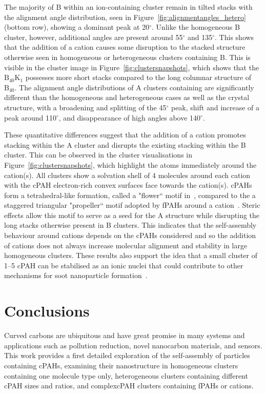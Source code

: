 The majority of B within an ion-containing cluster remain in tilted stacks with the alignment angle distribution, seen in Figure~\ref{fig:alignmentangles_hetero} (bottom row), showing a dominant peak at 20$^{\circ}$. Unlike the homogeneous B cluster, however, additional angles are present around 55$^{\circ}$ and 135$^{\circ}$. This shows that the addition of a cation causes some disruption to the stacked structure otherwise seen in homogeneous or heterogeneous clusters containing B. This is visible in the cluster image in Figure~\ref{fig:clustersnapshots}, which shows that the $\text{B}_{\text{40}}\text{K}_{\text{1}}$ possesses more short stacks compared to the long columnar structure of $\text{B}_{\text{40}}$.  The alignment angle distributions of A clusters containing  are significantly different than the homogeneous and heterogeneous cases as well as the crystal structure, with a broadening and splitting of the 45$^{\circ}$ peak, shift and increase of a peak around 110$^{\circ}$, and disappearance of high angles above 140$^{\circ}$.

These quantitative differences suggest that the addition of a cation promotes stacking within the A cluster and disrupts the existing stacking within the B cluster. This can be observed in the cluster visualisations in Figure~\ref{fig:clustersnapshots}, which highlight the atoms immediately around the cation(s). All clusters show a solvation shell of 4 molecules around each cation with the cPAH electron-rich convex surfaces face towards the cation(s). cPAHs form a tetrahedral-like formation, called a "flower`` motif in~\citet{bowal2019ion}, compared to the a staggered triangular "propeller`` motif adopted by fPAHs around a cation~\cite{bartolomei2019aggregation}. Steric effects allow this motif to serve as a seed for the A structure while disrupting the long stacks otherwise present in B clusters. This indicates that the self-assembly behaviour around cations depends on the cPAHs considered and so the addition of cations does not always increase molecular alignment and stability in large homogeneous clusters. These results also support the idea that a small cluster of 1--5 cPAH can be stabilised as an ionic nuclei that could contribute to other mechanisms for soot nanoparticle formation~\cite{Martin2018flexo}. 

\section{Conclusions}
Curved carbons are ubiquitous and have great promise in many systems and applications such as pollution reduction, novel nanocarbon materials, and sensors. This work provides a first detailed exploration of the self-assembly of particles containing cPAHs, examining their nanostructure in homogeneous clusters containing one molecule type only, heterogeneous clusters containing different cPAH sizes and ratios, and complexcPAH clusters containing fPAHs or cations.

